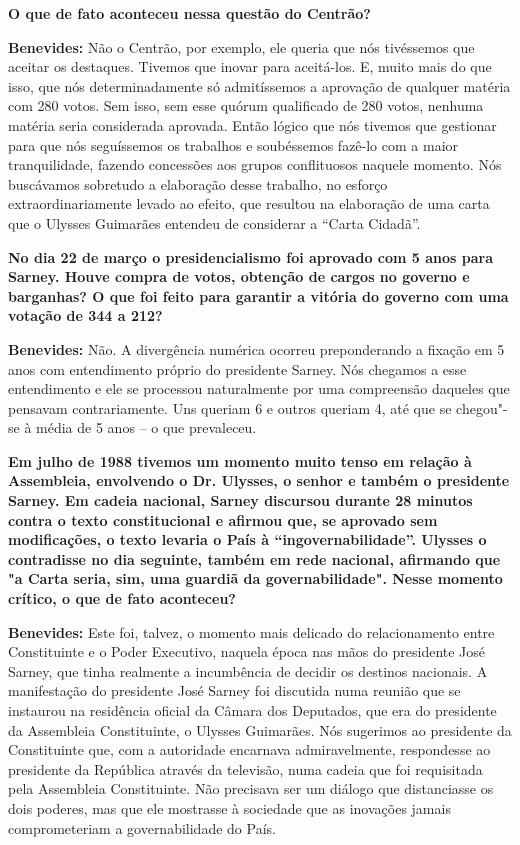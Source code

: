 \textbf{O que de fato aconteceu nessa questão do Centrão?}

\textbf{Benevides:} Não o Centrão, por exemplo, ele queria que nós
tivéssemos que aceitar os destaques. Tivemos que inovar para aceitá-los.
E, muito mais do que isso, que nós determinadamente só admitíssemos a
aprovação de qualquer matéria com 280 votos. Sem isso, sem esse quórum
qualificado de 280 votos, nenhuma matéria seria considerada aprovada.
Então lógico que nós tivemos que gestionar para que nós seguíssemos os
trabalhos e soubéssemos fazê-lo com a maior tranquilidade, fazendo
concessões aos grupos conflituosos naquele momento. Nós buscávamos
sobretudo a elaboração desse trabalho, no esforço extraordinariamente
levado ao efeito, que resultou na elaboração de uma carta que o Ulysses
Guimarães entendeu de considerar a ``Carta Cidadã''.

\textbf{No dia 22 de março o presidencialismo foi aprovado com 5 anos
para Sarney. Houve compra de votos, obtenção de cargos no governo e
barganhas? O que foi feito para garantir a vitória do governo com uma
votação de 344 a 212?}

\textbf{Benevides:} Não. A divergência numérica ocorreu preponderando a
fixação em 5 anos com entendimento próprio do presidente Sarney. Nós
chegamos a esse entendimento e ele se processou naturalmente por uma
compreensão daqueles que pensavam contrariamente. Uns queriam 6 e outros
queriam 4, até que se chegou"-se à média de 5 anos -- o que prevaleceu.

\textbf{Em julho de 1988 tivemos um momento muito tenso em relação à
Assembleia, envolvendo o Dr. Ulysses, o senhor e também o presidente
Sarney. Em cadeia nacional, Sarney discursou durante 28 minutos contra o
texto constitucional e afirmou que, se aprovado sem modificações, o
texto levaria o País à ``ingovernabilidade''. Ulysses o contradisse no
dia seguinte, também em rede nacional, afirmando que "a Carta seria,
sim, uma guardiã da governabilidade". Nesse momento crítico, o que de
fato aconteceu?}

\textbf{Benevides:} Este foi, talvez, o momento mais delicado do
relacionamento entre Constituinte e o Poder Executivo, naquela época nas
mãos do presidente José Sarney, que tinha realmente a incumbência de
decidir os destinos nacionais. A manifestação do presidente José Sarney
foi discutida numa reunião que se instaurou na residência oficial da
Câmara dos Deputados, que era do presidente da Assembleia Constituinte,
o Ulysses Guimarães. Nós sugerimos ao presidente da Constituinte que,
com a autoridade encarnava admiravelmente, respondesse ao presidente da
República através da televisão, numa cadeia que foi requisitada pela
Assembleia Constituinte. Não precisava ser um diálogo que distanciasse
os dois poderes, mas que ele mostrasse à sociedade que as inovações
jamais comprometeriam a governabilidade do País.

